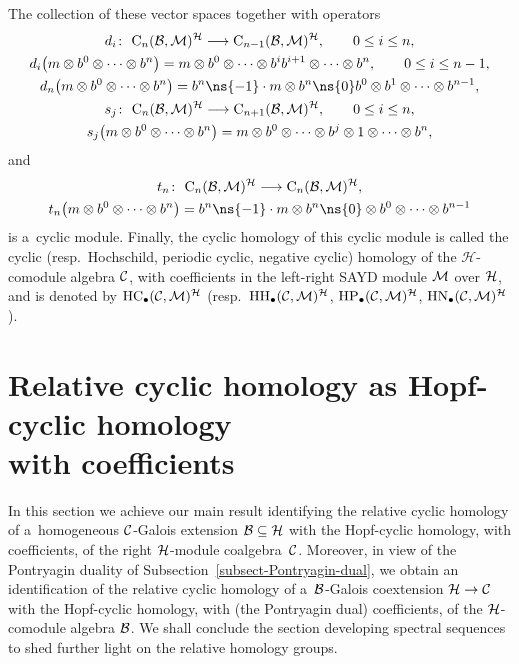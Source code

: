 The collection of these vector spaces together with operators
\begin{gather*}
d_i\colon \ {\rm C}_n({\cal B},{\cal M})^{{\cal H}} \longrightarrow {\rm C}_{n-1}({\cal B},{\cal M})^{{\cal H}},
\qquad
0 \leq i \leq n,
\\
d_i\big(m\otimes b^0 \otimes \cdots \otimes b^n\big) =m\otimes b^0 \otimes \cdots \otimes b^ib^{i+1}\otimes \cdots \otimes b^n,
\qquad
0 \leq i \leq n-1,
\\
d_n\big(m\otimes b^0 \otimes \cdots \otimes b^n\big) =b^n\ns{-1}\cdot m\otimes b^n\ns{0}b^0\otimes b^1 \otimes \cdots \otimes b^{n-1},
\\
s_j\colon \ {\rm C}_n({\cal B},{\cal M})^{{\cal H}} \longrightarrow {\rm C}_{n+1}({\cal B},{\cal M})^{{\cal H}},
\qquad
0 \leq i \leq n,
\\
s_j\big(m\otimes b^0 \otimes \cdots \otimes b^n\big) =m\otimes b^0 \otimes\cdots \otimes b^j\otimes 1\otimes\cdots \otimes b^n,
\end{gather*}
and
\begin{gather*}
t_n\colon \ {\rm C}_n({\cal B},{\cal M})^{{\cal H}} \longrightarrow {\rm C}_n({\cal B},{\cal M})^{{\cal H}},
\\
t_n\big(m\otimes b^0 \otimes \cdots \otimes b^n\big) =b^n\ns{-1}\cdot m\otimes b^n\ns{0}\otimes b^0\otimes \cdots \otimes b^{n-1}
\end{gather*}
is a~cyclic module.
Finally, the cyclic homology of this cyclic module is called the cyclic (resp.\
Hochschild, periodic cyclic, negative cyclic) homology of the $\mathcal{H}$-comodule algebra ${\cal C}$, with
coef\/f\/icients in the left-right SAYD module ${\cal M}$ over ${\cal H}$, and is denoted by ${\rm HC}_\bullet({\cal
C},{\cal M})^{\cal H}$ (resp.\
${\rm HH}_\bullet({\cal C},{\cal M})^{\cal H}$, ${\rm HP}_\bullet({\cal C},{\cal M})^{\cal H}$, ${\rm HN}_\bullet({\cal
C},{\cal M})^{\cal H}$).

\section{Relative cyclic homology as Hopf-cyclic homology\\ with coef\/f\/icients}

In this section we achieve our main result identifying the relative cyclic homology of a~homogeneous ${\cal C}$-Galois
extension ${\cal B}\subseteq{\cal H}$ with the Hopf-cyclic homology, with coef\/f\/icients, of the right ${\cal H}$-module
coalgebra~${\cal C}$.
Moreover, in view of the Pontryagin duality of Subsection~\ref{subsect-Pontryagin-dual}, we obtain an identif\/ication of
the relative cyclic homology of a~${\cal B}$-Galois coextension ${\cal H}\to {\cal C}$ with the Hopf-cyclic homology,
with (the Pontryagin dual) coef\/f\/icients, of the ${\cal H}$-comodule algebra ${\cal B}$.
We shall conclude the section developing spectral sequences to shed further light on the relative homology groups.

